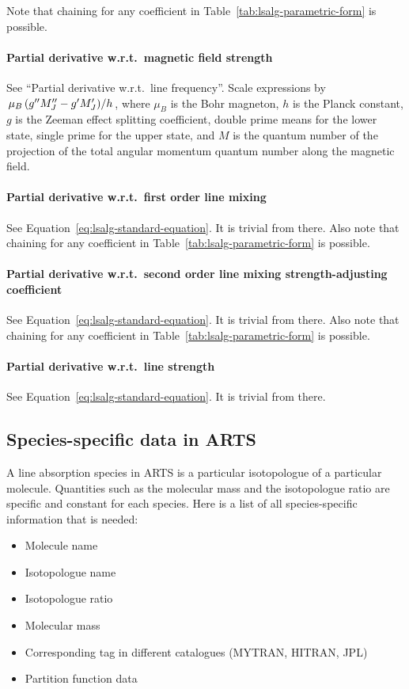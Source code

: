 Note that chaining for any coefficient in Table~\ref{tab:lsalg-parametric-form} is possible.

\paragraph*{Partial derivative w.r.t.\ magnetic field strength}

See ``Partial derivative w.r.t.\ line frequency''.  Scale expressions by $\left. \mu_B \left(g''M''_J-g'M'_J\right) \middle/h\right.$, where $\mu_B$
is the Bohr magneton, $h$ is the Planck constant, $g$ is the Zeeman effect splitting coefficient, double prime means for the lower state, single prime for the upper state, and $M$ is the quantum number of the projection of the total angular momentum quantum number along the magnetic field.

\paragraph*{Partial derivative w.r.t.\ first order line mixing}

See Equation~\ref{eq:lsalg-standard-equation}.  It is trivial from there.  Also note that chaining for
any coefficient in Table~\ref{tab:lsalg-parametric-form} is possible.

\paragraph*{Partial derivative w.r.t.\ second order line mixing strength-adjusting coefficient}

See Equation~\ref{eq:lsalg-standard-equation}.  It is trivial from there.  Also note that chaining for
any coefficient in Table~\ref{tab:lsalg-parametric-form} is possible.

\paragraph*{Partial derivative w.r.t.\ line strength}

See Equation~\ref{eq:lsalg-standard-equation}.  It is trivial from there.

\subsection{Species-specific data in ARTS}
\label{sec:abs_theory:species_data}

A line absorption species in ARTS is a particular isotopologue of a
particular molecule.  Quantities such as the molecular mass and the
isotopologue ratio are specific and constant for each species.  Here is a
list of all species-specific information that is needed:
\begin{itemize}
\item Molecule name
\item Isotopologue name
\item Isotopologue ratio
\item Molecular mass
\item Corresponding tag in different catalogues (MYTRAN, HITRAN, JPL)
\item Partition function data
\end{itemize}

